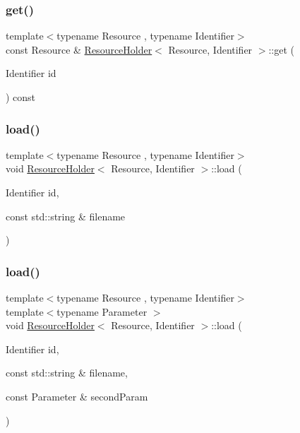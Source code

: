 \hypertarget{class_resource_holder_aaf453199dbdfb9b8395c52b29eb915c2}{}\label{class_resource_holder_aaf453199dbdfb9b8395c52b29eb915c2} 
\subsubsection{\texorpdfstring{get()}{get()}\hspace{0.1cm}{\footnotesize\ttfamily [2/2]}}
{\footnotesize\ttfamily template$<$typename Resource , typename Identifier$>$ \\
const Resource \& \hyperlink{class_resource_holder}{Resource\+Holder}$<$ Resource, Identifier $>$\+::get (\begin{DoxyParamCaption}\item[{Identifier}]{id }\end{DoxyParamCaption}) const}

\hypertarget{class_resource_holder_accb6a2b6bd2da503ddfd57b5c0028a16}{}\label{class_resource_holder_accb6a2b6bd2da503ddfd57b5c0028a16} 
\subsubsection{\texorpdfstring{load()}{load()}\hspace{0.1cm}{\footnotesize\ttfamily [1/2]}}
{\footnotesize\ttfamily template$<$typename Resource , typename Identifier$>$ \\
void \hyperlink{class_resource_holder}{Resource\+Holder}$<$ Resource, Identifier $>$\+::load (\begin{DoxyParamCaption}\item[{Identifier}]{id,  }\item[{const std\+::string \&}]{filename }\end{DoxyParamCaption})}

\hypertarget{class_resource_holder_ae83a7a88b2b2a74b6143796eb4452110}{}\label{class_resource_holder_ae83a7a88b2b2a74b6143796eb4452110} 
\subsubsection{\texorpdfstring{load()}{load()}\hspace{0.1cm}{\footnotesize\ttfamily [2/2]}}
{\footnotesize\ttfamily template$<$typename Resource , typename Identifier$>$ \\
template$<$typename Parameter $>$ \\
void \hyperlink{class_resource_holder}{Resource\+Holder}$<$ Resource, Identifier $>$\+::load (\begin{DoxyParamCaption}\item[{Identifier}]{id,  }\item[{const std\+::string \&}]{filename,  }\item[{const Parameter \&}]{second\+Param }\end{DoxyParamCaption})}



